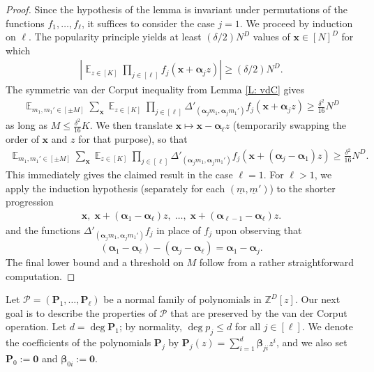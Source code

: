 \documentclass[11pt]{amsart}
\theoremstyle{definition}
\DeclareMathOperator*{\E}{\mathbb{E}}
\newcommand{\Z}{{\mathbb Z}}
\newcommand{\CP}{{\mathcal P}}
\newcommand{\bp}{{\mathbf{P}}}
\newcommand{\p}{{\mathbf{P}}}
\newcommand{\bx}{{\mathbf{x}}}
\newcommand{\balpha}{{\boldsymbol{\alpha}}}
\newcommand{\bbeta}{{\boldsymbol{\beta}}}
\newcommand{\um}{{\underline{m}}}
\newcommand{\abs}[1]{\mathopen{}\left| #1\mathclose{}\right|}
\begin{document}
\begin{proof}
Since the hypothesis of the lemma is invariant under permutations of the functions $f_1, \ldots, f_\ell$, it suffices to consider the case $j=1$. We proceed by induction on $\ell$. The popularity principle yields at least $(\delta/2)N^D$ values of $\bx\in[N]^D$ for which 
    \begin{align*}
        \abs{\E_{z\in[K]}\prod_{j\in[\ell]}f_j(\bx+\balpha_j z)}\geq (\delta/2) N^D.
    \end{align*}
The symmetric van der Corput inequality from Lemma \ref{L: vdC} gives
    \begin{align*}
        \E_{m_1, m_1'\in[\pm M]}\sum_{\bx}\E_{z\in[K]}\prod_{j\in[\ell]}\Delta'_{(\balpha_j m_1, \balpha_j m_1')}f_j(\bx+\balpha_j z) \geq \frac{\delta^2}{16}N^D
    \end{align*}
    as long as $M\leq \frac{\delta^2}{16}K$.
    We then translate $\bx\mapsto\bx-\balpha_\ell z$ (temporarily swapping the order of $\bx$ and $z$ for that purpose), so that
    \begin{align*}
        \E_{m_1, m_1'\in[\pm M]}\sum_{\bx}\E_{z\in[K]}\prod_{j\in[\ell]}\Delta'_{(\balpha_j m_1, \balpha_j m_1')}f_j(\bx+(\balpha_j-\balpha_1) z) \geq \frac{\delta^2}{16}N^D.
    \end{align*}    
    This immediately gives the claimed result in the case $\ell = 1$. For $\ell>1$, we apply the induction hypothesis (separately for each $(\um, \um')$) to the shorter progression
    \begin{align*}
        \bx,\; \bx + (\balpha_1 - \balpha_\ell)z,\; \ldots,\; \bx + (\balpha_{\ell-1} - \balpha_\ell)z.
    \end{align*}
    and the functions $\Delta'_{(\balpha_j m_1, \balpha_j m_1')}f_j$ in place of $f_j$ upon observing that $$(\balpha_1 - \balpha_\ell) - (\balpha_j - \balpha_\ell) = \balpha_1 - \balpha_j.$$ 
    The final lower bound and a threshold on $M$ follow from a rather straightforward computation.
\end{proof}

       {Let $\CP = (\p_1, \ldots, \p_\ell)$ be a normal family of polynomials in $\Z^D[z]$. Our next goal is to describe the properties of $\CP$ that are preserved by the van der Corput operation. Let $d =\deg\p_1$; by normality, $\deg p_j\leq d$ for all $j\in[\ell]$.
We denote the coefficients of the polynomials $\p_j$ by $\bp_j(z) = \sum_{i=1}^d \bbeta_{ji}z^i$, and we  also set $\bp_0 := \mathbf{0}$ and $\bbeta_{0i} := \mathbf{0}$.} 
\end{document}
